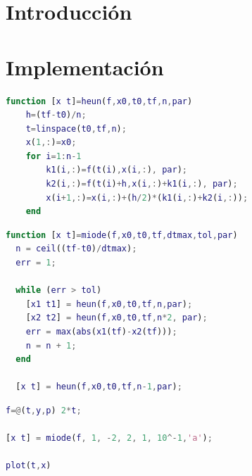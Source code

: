 \section{Introducci\'on}


\section{Implementaci\'on}

\begin{lstlisting}[language=Matlab, caption=heun.m]
function [x t]=heun(f,x0,t0,tf,n,par)
    h=(tf-t0)/n;
    t=linspace(t0,tf,n);
    x(1,:)=x0;
    for i=1:n-1
        k1(i,:)=f(t(i),x(i,:), par);
        k2(i,:)=f(t(i)+h,x(i,:)+k1(i,:), par);
        x(i+1,:)=x(i,:)+(h/2)*(k1(i,:)+k2(i,:));
    end
\end{lstlisting}

\begin{lstlisting}[language=Matlab, caption=miode.m]
function [x t]=miode(f,x0,t0,tf,dtmax,tol,par)
  n = ceil((tf-t0)/dtmax);
  err = 1;
  
  while (err > tol)
    [x1 t1] = heun(f,x0,t0,tf,n,par); 
    [x2 t2] = heun(f,x0,t0,tf,n*2, par);
    err = max(abs(x1(tf)-x2(tf)));
    n = n + 1;
  end
  
  [x t] = heun(f,x0,t0,tf,n-1,par); 
\end{lstlisting}

\begin{lstlisting}[language=Matlab, caption=ejemplo.m]
f=@(t,y,p) 2*t;

[x t] = miode(f, 1, -2, 2, 1, 10^-1,'a');

plot(t,x)
\end{lstlisting}


